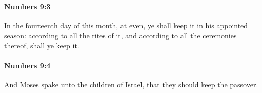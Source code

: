 		\paragraph{Numbers 9:3} %
			\label{NUMBERS-9-3}

			In the fourteenth day of this month, at even, ye shall keep it in his appointed season: according to all the rites of it, and according to all the ceremonies thereof, shall ye keep it.


		\paragraph{Numbers 9:4} %
			\label{NUMBERS-9-4}

			And Moses spake unto the children of Israel, that they should keep the passover.


